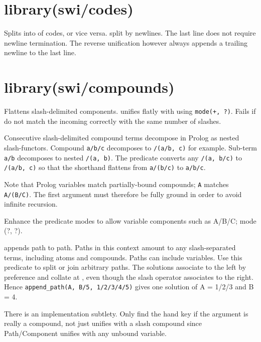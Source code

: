 \chapter{library(swi/codes)}\label{sec:codes}

\begin{description}
Splits  into  of codes, or vice versa.  split by
newlines. The last line does not require newline termination. The
reverse unification however always appends a trailing newline to the
last line.
\end{description}

\chapter{library(swi/compounds)}\label{sec:compounds}

\begin{description}
Flattens slash-delimited components.  unifies flatly with
 using \verb$mode(+, ?)$. Fails if  do not match the
incoming  correctly with the same number of slashes.

Consecutive slash-delimited compound terms decompose in Prolog as
nested slash-functors. Compound \verb$a/b/c$ decomposes to \verb$/(a/b, c)$
for example. Sub-term \verb$a/b$ decomposes to nested \verb$/(a, b)$. The
predicate converts any \verb$/(a, b/c)$ to \verb$/(a/b, c)$ so that the
shorthand flattens from \verb$a/(b/c)$ to \verb$a/b/c$.

Note that Prolog variables match partially-bound compounds; \verb$A$
matches \verb$A/(B/C)$. The first argument must therefore be fully ground
in order to avoid infinite recursion.

\begin{tags}
Enhance the predicate modes to allow variable components such
as A/B/C; mode (?, ?).
\end{tags}

 appends  path to  path. Paths in this context
amount to any slash-separated terms, including atoms and compounds.
Paths can include variables. Use this predicate to split or join
arbitrary paths. The solutions associate to the left by preference
and collate at , even though the slash operator associates to
the right. Hence \verb$append_path(A, B/5, 1/2/3/4/5)$ gives one solution
of A = 1/2/3 and B = 4.

There is an implementation subtlety. Only find the  hand key if
the argument is really a compound, not just unifies with a slash
compound since Path/Component unifies with any unbound variable.
\end{description}

